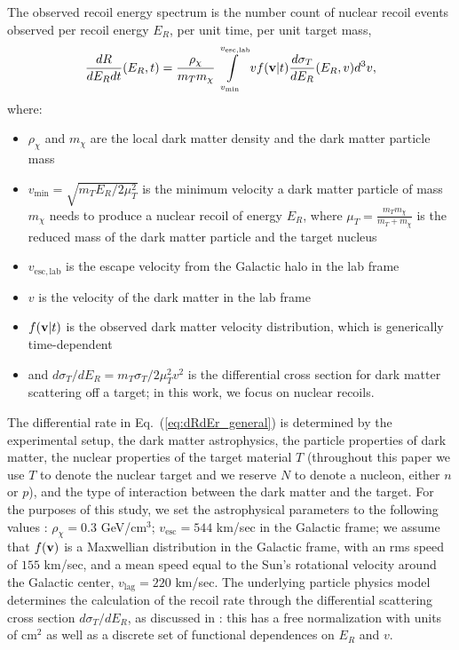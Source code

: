\documentclass[11pt]{article}
\newcommand{\Eq}[1]{Eq.~(\ref{#1})} \newcommand{\Eqs}[2]{Eqs.~(\ref{#1}) and (\ref{#2})} \newcommand{\Eqm}[2]{Eqs.~(\ref{#1}) through (\ref{#2})}
\begin{document}
The observed recoil energy spectrum is the number count of nuclear recoil events observed per recoil energy $E_R$, per unit time, per unit target mass,
\begin{equation}
\frac{dR}{dE_R dt}(E_R,t) =  \frac{\rho_\chi}{m_T m_\chi} \int\limits_{v_{\mathrm{min}}}^{v_{\mathrm{esc, lab}}}  v f(\mathrm{\mbox{\bf{v}}}|t) \frac{d\sigma_T}{dE_R} (E_R,v) d^3v ,
\label{eq:dRdEr_general}
\end{equation}
where:
\begin{itemize}
\item $\rho_\chi$ and $m_\chi$ are the local dark matter density and the dark matter particle mass
\item $v_\mathrm{min} = \sqrt{m_T E_R/2\mu_T^2}$ is the minimum velocity a dark matter particle of mass $m_\chi$ needs to produce a nuclear recoil of energy $E_R$, where $\mu_T=\frac{m_Tm_\chi}{m_T+m_\chi}$ is the reduced mass of the dark matter particle and the target nucleus
\item $v_{\mathrm{esc, lab}}$ is the escape velocity from the Galactic halo in the lab frame
\item $v$ is the velocity of the dark matter in the lab frame
\item $f(\mathrm{\mbox{\bf{v}}}|t)$ is the observed dark matter velocity distribution, which is generically time-dependent
\item and $d\sigma_T/dE_R=m_T \sigma_T /2\mu_T^2 v^2$ is the differential cross section for dark matter scattering off a target; in this work, we focus on nuclear recoils.
\end{itemize}
The differential rate in \Eq{eq:dRdEr_general} is determined by the experimental setup, the dark matter astrophysics, the particle properties of dark matter, the nuclear properties of the target material $T$ (throughout this paper we use $T$ to denote the nuclear target and we reserve $N$ to denote a nucleon, either $n$ or $p$), and the type of interaction between the dark matter and the target. For the purposes of this study, we set the astrophysical parameters to the following values \cite{Bovy:2013raa}: $\rho_\chi=0.3$ GeV/cm$^3$; $v_{\mathrm{esc}} = 544$ km/sec in the Galactic frame; we assume that $f(\mathrm{\mbox{\bf{v}}})$ is a Maxwellian distribution in the Galactic frame, with an rms speed of $155$ km/sec, and a mean speed equal to the Sun's rotational velocity around the Galactic center, $v_\textrm{lag}=220$ km/sec. The underlying particle physics model determines the calculation of the recoil rate through the differential scattering cross section ${d\sigma_T}/{dE_R}$, as discussed in \cite{Gluscevic:2015sqa,Gresham:2014vja}: this has a free normalization with units of cm${}^2$ as well as a discrete set of functional dependences on $E_R$ and $v$.
\end{document}
